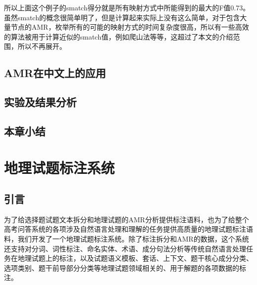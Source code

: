 \documentclass[master, winfont]{njuthesis}
\begin{document}
所以上面这个例子的smatch得分就是所有映射方式中所能得到的最大的F值0.73。虽然smatch的概念很简单明了，但是计算起来实际上没有这么简单，对于包含大量节点的AMR，枚举所有的可能的映射方式的时间复杂度很高，所以有一些高效的算法被用于计算近似的smatch值，例如爬山法等等，这超过了本文的介绍范围，所以不再展开。

\section{AMR在中文上的应用}
\section{实验及结果分析}
\section{本章小结}

\chapter{地理试题标注系统}
\label{chapter:tagger}
\section{引言}
为了给选择题试题文本拆分和地理试题的AMR分析提供标注语料，也为了给整个高考问答系统的各项涉及自然语言处理和理解的任务提供高质量的地理试题标注语料，我们开发了一个地理试题标注系统。除了标注拆分和AMR的数据，这个系统还支持对分词、词性标注、命名实体、术语、成分句法分析等传统自然语言处理任务在地理试题上的标注，以及试题语义模板、套话、上下文、题干核心成分分类、选项类别、题干前导部分分类等地理试题领域相关的、用于解题的各项数据的标注。
\end{document}
